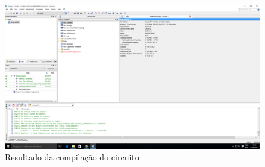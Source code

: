 	\begin{figure}[htb]
	    \centering
		\caption{\label{fig:printCompilacao2}Resultado da compilação do circuito}
		\includegraphics[width=1\textwidth]{img/cenario2/printCompilacao}
	\end{figure}


